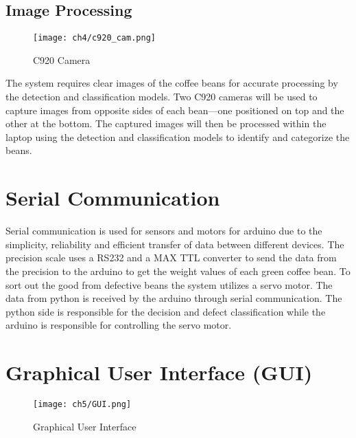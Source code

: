 \subsection{Image Processing}

\begin{figure}[H]
    \centering
    \texttt{[image: ch4/c920\_cam.png]} %
    \caption{C920 Camera}
    \label{fig:c920_camera}
\end{figure}

The system requires clear images of the coffee beans for accurate processing by the detection and classification models. Two C920 cameras will be used to capture images from opposite sides of each bean—one positioned on top and the other at the bottom. The captured images will then be processed within the laptop using the detection and classification models to identify and categorize the beans.

\section{Serial Communication}

Serial communication is used for sensors and motors for arduino due to the simplicity, reliability and efficient transfer of data between different devices. The precision scale uses a RS232 and a MAX TTL converter to send the data from the precision to the arduino to get the weight values of each green coffee bean. To sort out the good from defective beans the system utilizes a servo motor. The data from python is received by the arduino through serial communication. The python side is responsible for the decision and defect classification while the arduino is responsible for controlling the servo motor.  

\section{Graphical User Interface (GUI)}

\begin{figure}[h]
    \centering
    \texttt{[image: ch5/GUI.png]} %
    \caption{Graphical User Interface}
    \label{fig:gui}
\end{figure}

